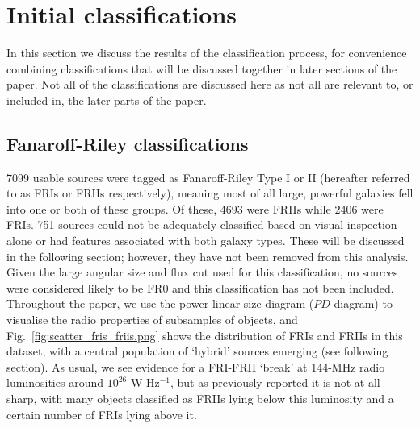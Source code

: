 \documentclass{aa}
\begin{document}
\begin{table}
\end{table}

\section{Initial classifications}

In this section we discuss the results of the classification process, for convenience combining classifications that will be discussed together in later sections of the paper. Not all of the classifications are discussed here as not all are relevant to, or included in, the later parts of the paper.

\subsection{Fanaroff-Riley classifications}
7099 usable sources were tagged as Fanaroff-Riley Type I or II (hereafter referred to as FRIs or FRIIs respectively), meaning most of all large, powerful galaxies fell into one or both of these groups. Of these, 4693 were FRIIs while 2406 were FRIs. 751 sources could not be adequately classified based on visual inspection alone or had features associated with both galaxy types. These will be discussed in the following section; however, they have not been removed from this analysis. Given the large angular size and flux cut used for this classification, no sources were considered likely to be FR0 and this classification has not been included. Throughout the paper, we use the power-linear size diagram ($PD$ diagram) to visualise the radio properties of subsamples of objects, and Fig.~\ref{fig:scatter_fris_friis.png} shows the distribution of FRIs and FRIIs in this dataset, with a central population of `hybrid' sources emerging (see following section). As usual, we see evidence for a FRI-FRII `break' at 144-MHz radio luminosities around $10^{26}$ W Hz$^{-1}$, but as previously reported \citep{mingo19} it is not at all sharp, with many objects classified as FRIIs lying below this luminosity and a certain number of FRIs lying above it.
\end{document}
